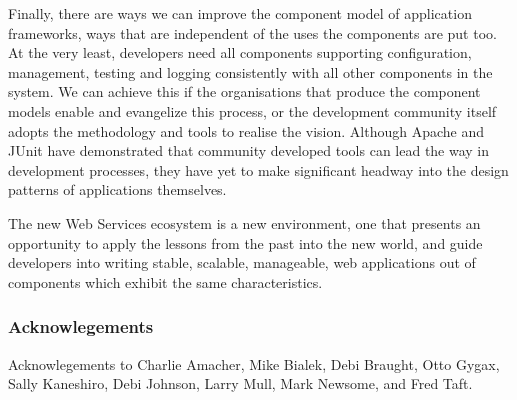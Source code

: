 \documentclass[draft]{report}
\begin{document}
Finally, there are ways we can improve the component model of
application frameworks, ways that are independent of the uses the
components are put too. At the very least, developers need all
components supporting configuration, management, testing and logging
consistently with all other components in the system. We can achieve
this if the organisations that produce the component models enable and
evangelize this process, or the development community itself adopts the
methodology and tools to realise the vision. Although Apache and JUnit
have demonstrated that community developed tools can lead the way in
development processes, they have yet to make significant headway into
the design patterns of applications themselves.

The new Web Services ecosystem is a new environment, one that presents
an opportunity to apply the lessons from the past into the new world,
and guide developers into writing stable, scalable, manageable, web
applications out of components which exhibit the same characteristics.

\subsubsection{Acknowlegements}

Acknowlegements to Charlie Amacher, Mike Bialek, Debi Braught, Otto
Gygax, Sally Kaneshiro, Debi Johnson, Larry Mull, Mark Newsome, and Fred
Taft.




\onecolumn

%


\end{document}
